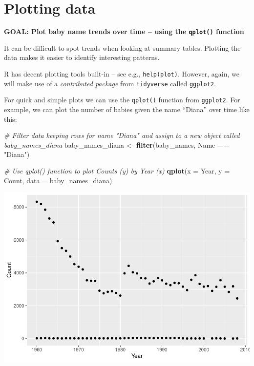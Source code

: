 \documentclass[
]{book}
\newenvironment{Shaded}{\begin{snugshade}}{\end{snugshade}}
\newcommand{\CommentTok}[1]{\textcolor[rgb]{0.56,0.35,0.01}{\textit{#1}}}
\newcommand{\DataTypeTok}[1]{\textcolor[rgb]{0.13,0.29,0.53}{#1}}
\newcommand{\KeywordTok}[1]{\textcolor[rgb]{0.13,0.29,0.53}{\textbf{#1}}}
\newcommand{\NormalTok}[1]{#1}
\newcommand{\OperatorTok}[1]{\textcolor[rgb]{0.81,0.36,0.00}{\textbf{#1}}}
\newcommand{\StringTok}[1]{\textcolor[rgb]{0.31,0.60,0.02}{#1}}
\begin{document}
\hypertarget{plotting-data}{%
\section{Plotting data}\label{plotting-data}}

\begin{alert}

\textbf{GOAL: Plot baby name trends over time -- using the \texttt{qplot()} function}

\end{alert}

It can be difficult to spot trends when looking at summary tables.
Plotting the data makes it easier to identify interesting patterns.

R has decent plotting tools built-in -- see e.g., \texttt{help(plot)}.
However, again, we will make use of a \emph{contributed
package} from \texttt{tidyverse} called \texttt{ggplot2}.

For quick and simple plots we can use the \texttt{qplot()} function from \texttt{ggplot2}. For example,
we can plot the number of babies given the name ``Diana'' over time like this:

\begin{Shaded}
\begin{Highlighting}[]
\CommentTok{\# Filter data keeping rows for name "Diana" and assign to a new object called baby\_names\_diana}
\NormalTok{baby\_names\_diana \textless{}{-}}\StringTok{ }\KeywordTok{filter}\NormalTok{(baby\_names, Name }\OperatorTok{==}\StringTok{ "Diana"}\NormalTok{)}
\end{Highlighting}
\end{Shaded}

\begin{Shaded}
\begin{Highlighting}[]
\CommentTok{\# Use qplot() function to plot Counts (y) by Year (x)}
\KeywordTok{qplot}\NormalTok{(}\DataTypeTok{x =}\NormalTok{ Year, }\DataTypeTok{y =}\NormalTok{ Count,}
     \DataTypeTok{data =}\NormalTok{ baby\_names\_diana)}
\end{Highlighting}
\end{Shaded}

\includegraphics{R/Rintro/figures/unnamed-chunk-42-1.pdf}
\end{document}
